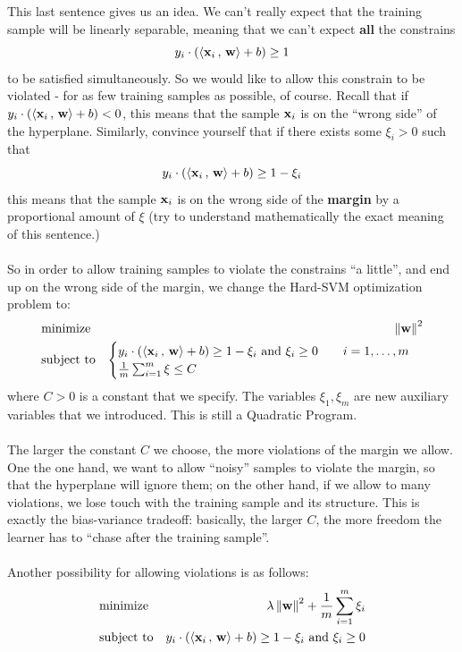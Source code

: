   This last sentence gives us an idea. We can't really expect that the training
  sample will be linearly separable, meaning that we can't expect {\bf all} the
  constrains
   \[
    y_i \cdot \left( {\left\langle \mathbf{x}_i\,,\,\mathbf{w} \right\rangle}
      +b \right) \geq 1  
  \]
  to be satisfied simultaneously. So we would like to allow this constrain to be
  violated - for as few training samples as possible, of course. Recall that if
  $ y_i \cdot \left( {\left\langle \mathbf{x}_i\,,\,\mathbf{w} \right\rangle}
  +b \right) <0$, this means that the sample $\mathbf{x}_i$ is on the ``wrong side''
  of the hyperplane. Similarly, convince yourself that if there exists some
  $\xi_i>0$ such that 
  \[
  y_i \cdot \left( {\left\langle \mathbf{x}_i\,,\,\mathbf{w} \right\rangle}
+b \right) \geq 1-\xi_i  \]
this means that the sample $\mathbf{x}_i$ is  on the wrong side of the {\bf margin}
by a proportional amount of $\xi$ (try to understand mathematically the exact meaning of this
sentence.)
\\~\\ So in order to allow training samples to violate the constrains ``a
little'', and end up on the wrong side of the margin, we change the Hard-SVM
optimization problem to:
\begin{eqnarray*}
      & \text{minimize}   &  \left\| \mathbf{w}\right\|^2 \\
      & \text{subject to} & \begin{cases} y_i \cdot \left( {\left\langle \mathbf{x}_i\,,\,\mathbf{w} \right\rangle}
     +b \right) \geq 1-\xi_i  \,\,\text{and}\,\, \xi_i\geq 0 \qquad 
i=1,\ldots,m & \\
 \frac{1}{m}\sum_{i=1}^m \xi \leq C &
 \end{cases}
    \end{eqnarray*}
    where $C>0$ is a constant that we specify. The variables $\xi_1,\xi_m$ are
    new auxiliary variables that we introduced. This is still a Quadratic
    Program.
    \\~\\
    The larger the constant $C$ we choose, the more violations of the margin we
    allow. One the one hand, we want to allow ``noisy'' samples to violate the
    margin, so that the hyperplane will ignore them; on the other hand, 
    if we allow to many violations, we lose touch with the training sample and
    its structure. This is exactly the bias-variance tradeoff: basically, the
    larger $C$, the more freedom the learner has to ``chase after the training
    sample''. 
\\~\\
Another possibility for allowing violations is as follows:
\begin{eqnarray*}
      & \text{minimize}   &  \lambda \left\| \mathbf{w}\right\|^2 + \frac{1}{m}\sum_{i=1}^m
      \xi_i \\
      & \text{subject to} & y_i \cdot \left( {\left\langle \mathbf{x}_i\,,\,\mathbf{w} \right\rangle}
     +b \right) \geq 1-\xi_i  \,\,\text{and}\,\, \xi_i\geq 0 
    \end{eqnarray*}
